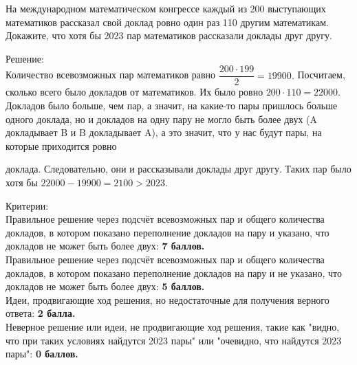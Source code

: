 \hspace{3mm}

На международном математическом конгрессе каждый из 200 выступающих математиков рассказал свой доклад ровно один раз 110 другим математикам. Докажите, что хотя бы 2023 пар математиков рассказали доклады друг другу.

\hspace{3mm}

Решение:\\
Количество всевозможных пар математиков равно $\dfrac{200\cdot 199}{2} = 19900.$ Посчитаем, сколько всего было докладов от математиков. Их было ровно $200\cdot110 = 22000.$  Докладов было больше, чем пар, а значит, на какие-то пары пришлось больше одного доклада, но и докладов на одну пару не могло быть более двух (A докладывает B и B докладывает A), а это значит, что у нас будут пары, на которые приходится ровно 

\newpage

\hspace{3mm}

 доклада. Следовательно, они и рассказывали доклады друг другу. Таких пар было хотя бы $22000 - 19900 = 2100 > 2023.$

\hspace{3mm}

Критерии:\\
Правильное решение через подсчёт всевозможных пар и общего количества докладов, в котором показано переполнение докладов на пару и указано, что докладов не может быть более двух: \textbf{7 баллов.}\\
Правильное решение через подсчёт всевозможных пар и общего количества докладов, в котором показано переполнение докладов на пару и не указано, что докладов не может быть более двух: \textbf{5 баллов.}\\
Идеи, продвигающие ход решения, но недостаточные для получения верного ответа: \textbf{2 балла.}\\
Неверное решение или идеи, не продвигающие ход решения, такие как "видно, что при таких условиях найдутся 2023 пары" или "очевидно, что найдутся 2023 пары": \textbf{0 баллов.}






